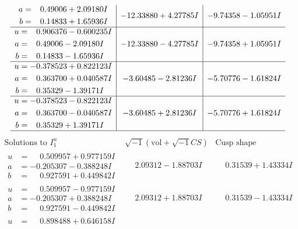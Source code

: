\documentclass[1p]{elsarticle_modified}
\theoremstyle{definition}
\newcommand{\I}{\sqrt{-1}}
\begin{document}
$$\begin{array}{c|c|c}
\begin{aligned}
a &= \phantom{-}0.49006 + 2.09180 I \\
b &= \phantom{-}0.14833 + 1.65936 I\end{aligned}
 & -12.33880 + 4.27785 I & -9.74358 - 1.05951 I \\ \hline\begin{aligned}
u &= \phantom{-}0.906376 - 0.600235 I \\
a &= \phantom{-}0.49006 - 2.09180 I \\
b &= \phantom{-}0.14833 - 1.65936 I\end{aligned}
 & -12.33880 - 4.27785 I & -9.74358 + 1.05951 I \\ \hline\begin{aligned}
u &= -0.378523 + 0.822123 I \\
a &= \phantom{-}0.363700 + 0.040587 I \\
b &= \phantom{-}0.35329 - 1.39171 I\end{aligned}
 & -3.60485 - 2.81236 I & -5.70776 - 1.61824 I \\ \hline\begin{aligned}
u &= -0.378523 - 0.822123 I \\
a &= \phantom{-}0.363700 - 0.040587 I \\
b &= \phantom{-}0.35329 + 1.39171 I\end{aligned}
 & -3.60485 + 2.81236 I & -5.70776 + 1.61824 I\\
 \hline 
 \end{array}$$\newpage$$\begin{array}{c|c|c}  
\text{Solutions to }I^u_{1}& \I (\text{vol} + \sqrt{-1}CS) & \text{Cusp shape}\\
 \hline 
\begin{aligned}
u &= \phantom{-}0.509957 + 0.977159 I \\
a &= -0.205307 - 0.388248 I \\
b &= \phantom{-}0.927591 + 0.449842 I\end{aligned}
 & \phantom{-}2.09312 - 1.88703 I & \phantom{-}0.31539 + 1.43334 I \\ \hline\begin{aligned}
u &= \phantom{-}0.509957 - 0.977159 I \\
a &= -0.205307 + 0.388248 I \\
b &= \phantom{-}0.927591 - 0.449842 I\end{aligned}
 & \phantom{-}2.09312 + 1.88703 I & \phantom{-}0.31539 - 1.43334 I \\ \hline\begin{aligned}
u &= \phantom{-}0.898488 + 0.646158 I \\

\end{aligned}
\end{array}$$
\end{document}
